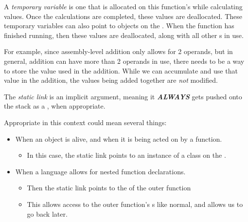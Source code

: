 \begin{definition}\label{def:Temporary_Variable}
  A \emph{temporary variable} is one that is allocated on this function's  while calculating values.
  Once the calculations are completed, these values are deallocated.
  These temporary variables can also point to objects on the .
  When the function has finished running, then these values are deallocated, along with all other s in use.

  For example, since assembly-level addition only allows for 2 operands, but in general, addition can have more than 2 operands in use, there needs to be a way to store the value used in the addition.
  While we can accumulate and use that value in the addition, the values being added together are \emph{not} modified.
\end{definition}

\begin{definition}\label{def:Static_Link}
  The \emph{static link} is an implicit argument, meaning it \textbf{\emph{ALWAYS}} gets pushed onto the stack as a , when appropriate.

  Appropriate in this context could mean several things:
  \begin{itemize}[noitemsep]
  \item When an object is alive, and when it is being acted on by a function.
    \begin{itemize}[noitemsep]
    \item In this case, the static link points to an instance of a class on the .
    \end{itemize}
  \item When a language allows for nested function declarations.
    \begin{itemize}[noitemsep]
    \item Then the static link points to the  of the outer function
    \item This allows access to the outer function's s like normal, and allows us to go back later.
    \end{itemize}
  \end{itemize}
\end{definition}

